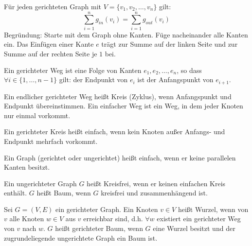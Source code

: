 \begin{bemerkung}
    Für jeden gerichteten Graph mit $V = \{ v_1, v_2, \dots, v_n \}$ gilt:
    $$\sum_{i=1}^n g_{in}(v_i) = \sum_{i=1}^n g_{out}(v_i)$$
    Begründung: Starte mit dem Graph ohne Kanten. Füge nacheinander alle Kanten
    ein. Das Einfügen einer Kante $e$ trägt zur Summe auf der linken Seite und
    zur Summe auf der rechten Seite je $1$ bei.
\end{bemerkung}


\begin{definition}
    
    Ein gerichteter Weg ist eine Folge von Kanten $e_1, e_2, \dots, e_n$, so
    dass $\forall i \in \{ 1, \dots, n-1 \}$ gilt: der Endpunkt von $e_i$ ist
    der Anfangspunkt von $e_{i+1}$.
    
    Ein endlicher gerichteter Weg heißt Kreis (Zyklus), wenn Anfangspunkt und
    Endpunkt übereinstimmen. Ein einfacher Weg ist ein Weg, in dem jeder Knoten
    nur einmal vorkommt.
    
    Ein gerichteter Kreis heißt einfach, wenn kein Knoten außer Anfangs- und
    Endpunkt mehrfach vorkommt.
\end{definition}


\begin{definition}

    Ein Graph (gerichtet oder ungerichtet) heißt einfach, wenn er keine
    parallelen Kanten besitzt.
\end{definition}


\begin{definition}
    
    Ein ungerichteter Graph $G$ heißt Kreisfrei, wenn er keinen einfachen Kreis
    enthält. $G$ heißt Baum, wenn $G$ kreisfrei und zusammenhängend ist.
\end{definition}


\begin{definition}

    Sei $G = (V, E)$ ein gerichteter Graph. Ein Knoten $v \in V$ heißt Wurzel,
    wenn von $v$ alle Knoten $w \in V$ aus $v$ erreichbar sind, d.h. $\forall
    w$  existiert ein gerichteter Weg von $v$ nach $w$. $G$ heißt gerichteter
    Baum, wenn $G$ eine Wurzel besitzt und der zugrundeliegende ungerichtete
    Graph ein Baum ist.
\end{definition}


